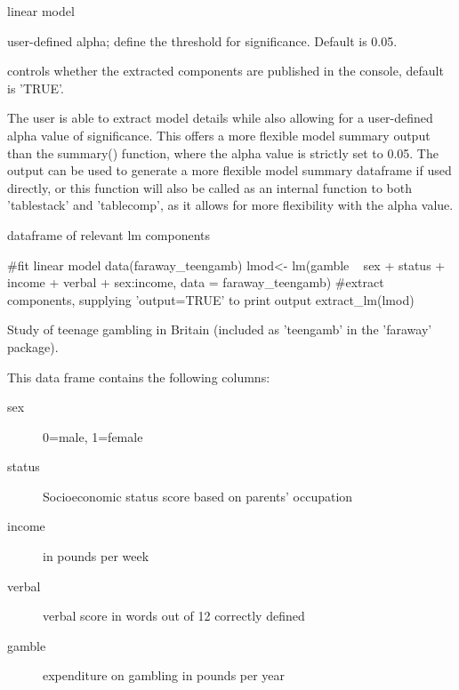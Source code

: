\documentclass[a4paper]{book}
\begin{document}
%
\begin{Arguments}
\begin{ldescription}
\item[\code{lm}] linear model

\item[\code{alpha}] user-defined alpha; define the threshold for significance. Default is 0.05.

\item[\code{output}] controls whether the extracted components are published in the console, default is 'TRUE'.
\end{ldescription}
\end{Arguments}
%
\begin{Details}
The user is able to extract model details while also allowing for a user-defined alpha value of significance. This offers a more flexible model summary output
than the summary() function, where the alpha value is strictly set to 0.05. The output can be used to generate a more flexible model summary dataframe if used directly,
or this function will also be called as an internal function to both 'tablestack' and 'tablecomp', as it allows for more flexibility with the alpha value.
\end{Details}
%
\begin{Value}
dataframe of relevant lm components
\end{Value}
%
\begin{Examples}
\begin{ExampleCode}
#fit linear model
 data(faraway_teengamb)
 lmod<- lm(gamble ~ sex + status + income + verbal + sex:income, data = faraway_teengamb)
#extract components, supplying 'output=TRUE' to print output
 extract_lm(lmod)

\end{ExampleCode}
\end{Examples}
%
\begin{Description}
Study of teenage gambling in Britain (included as 'teengamb' in the 'faraway' package).
\end{Description}
%
\begin{Format}
This data frame contains the following columns:
\begin{description}

\item[sex] 0=male, 1=female
\item[status] Socioeconomic status score based on parents' occupation
\item[income] in pounds per week
\item[verbal] verbal score in words out of 12 correctly defined
\item[gamble] expenditure on gambling in pounds per year

\end{description}

\end{Format}
\end{document}
